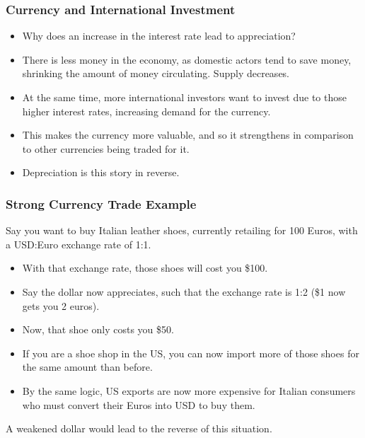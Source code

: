 \documentclass[handout]{beamer}
\begin{document}
\begin{frame} 
	\frametitle{\LARGE{Currency and International Investment}}
	\begin{itemize}
		\item Why does an increase in the interest rate lead to appreciation? \pause
		\item There is less money in the economy, as domestic actors tend to save money, shrinking the amount of money circulating. Supply decreases. \pause
		\item At the same time, more international investors want to invest due to those higher interest rates, increasing demand for the currency. \pause
		\item This makes the currency more valuable, and so it strengthens in comparison to other currencies being traded for it. \pause
		\item Depreciation is this story in reverse.
	\end{itemize}
\end{frame}

\begin{frame} 
	\frametitle{\LARGE{Strong Currency Trade Example}}
	Say you want to buy Italian leather shoes, currently retailing for 100 Euros, with a USD:Euro exchange rate of 1:1.
	\begin{itemize}
		\item With that exchange rate, those shoes will cost you \$100. \pause 
		\item Say the dollar now appreciates, such that the exchange rate is 1:2 (\$1 now gets you 2 euros). \pause
		\item Now, that shoe only costs you \$50.
		\item If you are a shoe shop in the US, you can now import more of those shoes for the same amount than before. \pause
		\item By the same logic, US exports are now more expensive for Italian consumers who must convert their Euros into USD to buy them. \pause
	\end{itemize}
	A weakened dollar would lead to the reverse of this situation.
\end{frame}
\end{document}
